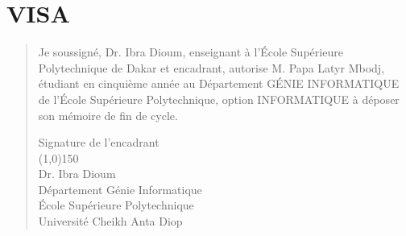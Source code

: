 %
%
%
%
%
%
\chapter*{VISA}
\begin{SingleSpace}
	\begin{quote}
		\large {
			Je soussigné, Dr. Ibra Dioum, enseignant à l’École Supérieure
			Polytechnique de Dakar et encadrant, autorise M. Papa Latyr Mbodj, étudiant en cinquième année au Département GÉNIE INFORMATIQUE de l’École Supérieure
			Polytechnique, option INFORMATIQUE à déposer son mémoire de fin de cycle.} 
		\vspace{6cm}
		\begin{center}
			\large{Signature de l'encadrant}\\
			\vspace{12mm}
			\line(1,0){150}\\
			\large {Dr. Ibra Dioum}\\
			\vspace{2mm}
			\large {Département Génie Informatique}\\
			\large {École Supérieure Polytechnique}\\
			\large {Université Cheikh Anta Diop}\\
		\end{center}
		
		
	\end{quote}
\end{SingleSpace}
